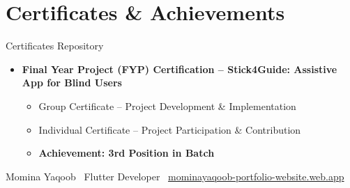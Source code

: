 \documentclass[10pt,a4paper]{article}
\begin{document}
\section{Certificates \& Achievements}
\footnotesize\textcolor{textgray}{Certificates Repository}
\begin{itemize}[leftmargin=1.1em, itemsep=1pt, topsep=3pt, parsep=0pt]
  \item \textbf{Final Year Project (FYP) Certification -- Stick4Guide: Assistive App for Blind Users}
  \begin{itemize}[leftmargin=1.2em, itemsep=0pt, topsep=1pt]
    \item Group Certificate -- Project Development \& Implementation
    \item Individual Certificate -- Project Participation \& Contribution
    \item \textbf{Achievement: 3rd Position in Batch}
  \end{itemize}
\end{itemize}

\vfill
\begin{center}
\footnotesize\color{textgray}
Momina Yaqoob \textbar\ Flutter Developer \textbar\
\href{https://mominayaqoob-portfolio-website.web.app}{mominayaqoob-portfolio-website.web.app}
\end{center}
\end{document}
